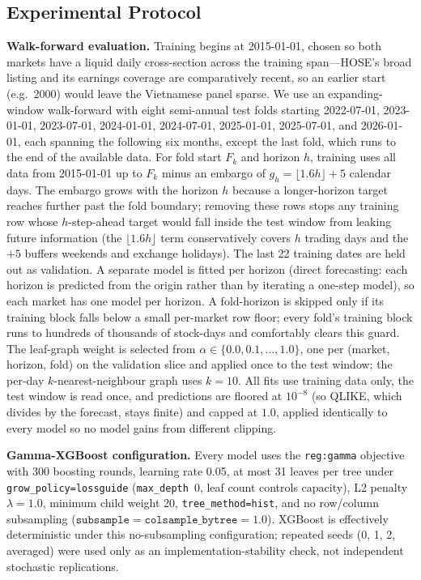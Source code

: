 \documentclass[runningheads,a4paper]{llncs}
\begin{document}
\subsection{Experimental Protocol}
\textbf{Walk-forward evaluation.} Training begins at 2015-01-01, chosen so both markets have a liquid daily
cross-section across the training span---HOSE's broad listing and its earnings coverage are comparatively
recent, so an earlier start (e.g.\ 2000) would leave the Vietnamese panel sparse. We use an expanding-window walk-forward
with eight semi-annual test folds starting 2022-07-01, 2023-01-01, 2023-07-01, 2024-01-01, 2024-07-01,
2025-01-01, 2025-07-01, and 2026-01-01, each spanning the following six months, except the last fold, which runs to the end of the available data. For fold start $F_k$ and
horizon $h$, training uses all data from 2015-01-01 up to $F_k$ minus an embargo of
$g_h=\lfloor 1.6h\rfloor+5$ calendar days. The embargo grows with the horizon $h$ because a longer-horizon
target reaches further past the fold boundary; removing these rows stops any training row whose
$h$-step-ahead target would fall inside the test window from leaking future information (the
$\lfloor 1.6h\rfloor$ term conservatively covers $h$ trading days and the $+5$ buffers weekends and exchange
holidays). The last 22 training dates are held out as validation. A
separate model is fitted per horizon (direct forecasting: each horizon is predicted from the origin
rather than by iterating a one-step model), so each market has one model per horizon. A fold-horizon is
skipped only if its training block falls below a small per-market row floor; every fold's training block
runs to hundreds of thousands of stock-days and comfortably clears this guard. The leaf-graph weight is selected from
$\alpha\in\{0.0,0.1,\dots,1.0\}$, one per (market, horizon, fold) on the validation slice and applied once
to the test window; the per-day $k$-nearest-neighbour graph uses $k=10$. All fits use training data only,
the test window is read once, and predictions are floored at $10^{-8}$ (so QLIKE, which divides by the
forecast, stays finite) and capped at $1.0$, applied identically to every model so no model gains from
different clipping.

\textbf{Gamma-XGBoost configuration.} Every model uses the \texttt{reg:gamma} objective with 300 boosting
rounds, learning rate 0.05, at most 31 leaves per tree under \texttt{grow\_policy=lossguide}
(\texttt{max\_depth}~0, leaf count controls capacity), L2 penalty $\lambda=1.0$, minimum child weight 20,
\texttt{tree\_method=hist}, and no row/column subsampling
($\texttt{subsample}=\texttt{colsample\_bytree}=1.0$). XGBoost is effectively deterministic under this
no-subsampling configuration; repeated seeds (0, 1, 2, averaged) were used only as an implementation-stability
check, not independent stochastic replications.
\end{document}
